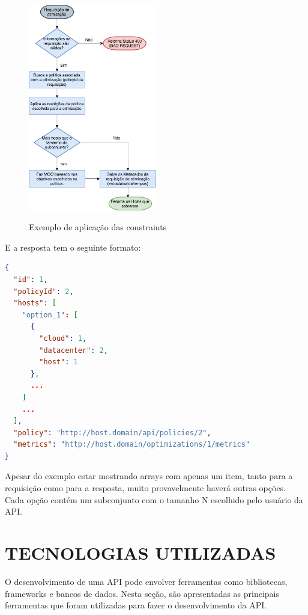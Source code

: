 \begin{figure}[!htb]
  \centering
  \caption{Exemplo de aplicação das constraints}
  \includegraphics[width=0.5\textwidth]{./dados/figuras/fluxograma-otimizacao.png}
  \label{fig:fluxograma-otimizacao}
\end{figure}

E a resposta tem o seguinte formato:

\begin{lstlisting}[language=json,firstnumber=1]
{
  "id": 1,
  "policyId": 2,
  "hosts": [
    "option_1": [
      {
        "cloud": 1,
        "datacenter": 2,
        "host": 1
      },
      ...
    ] 
    ...
  ],
  "policy": "http://host.domain/api/policies/2",
  "metrics": "http://host.domain/optimizations/1/metrics"
}
\end{lstlisting}

Apesar do exemplo estar mostrando arrays com apenas um item,
tanto para a requisição como para a resposta, muito provavelmente 
haverá outras opções. Cada opção contém um subconjunto com o tamanho
N escolhido pelo usuário da API. 

\section{TECNOLOGIAS UTILIZADAS}

O desenvolvimento de uma API pode envolver ferramentas como bibliotecas, frameworks e 
bancos de dados. Nesta seção, são apresentadas as principais ferramentas que foram utilizadas para
fazer o desenvolvimento da API. 

